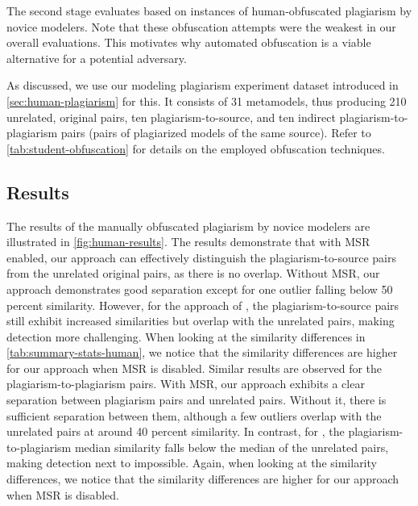 \noindent
The second stage evaluates based on instances of human-obfuscated plagiarism by novice modelers.
Note that these obfuscation attempts were the weakest in our overall evaluations. This motivates why automated obfuscation is a viable alternative for a potential adversary.

As discussed, we use our modeling plagiarism experiment dataset introduced in \autoref{sec:human-plagiarism} for this.
It consists of 31 metamodels, thus producing 210 unrelated, original pairs, ten plagiarism-to-source, and ten indirect plagiarism-to-plagiarism pairs (pairs of plagiarized models of the same source). Refer to \autoref{tab:student-obfuscation} for details on the employed obfuscation techniques.

\subsection{Results}
The results of the manually obfuscated plagiarism by novice modelers are illustrated in \autoref{fig:human-results}.
The results demonstrate that with MSR enabled, our approach can effectively distinguish the plagiarism-to-source pairs from the unrelated original pairs, as there is no overlap. Without MSR, our approach demonstrates good separation except for one outlier falling below 50 percent similarity. However, for the approach of \citet{Martinez2020}, the plagiarism-to-source pairs still exhibit increased similarities but overlap with the unrelated pairs, making detection more challenging.
When looking at the similarity differences in \autoref{tab:summary-stats-human}, we notice that the similarity differences are higher for our approach when MSR is disabled.
%
Similar results are observed for the plagiarism-to-plagiarism pairs. With MSR, our approach exhibits a clear separation between plagiarism pairs and unrelated pairs. Without it, there is sufficient separation between them, although a few outliers overlap with the unrelated pairs at around 40 percent similarity. In contrast, for \citet{Martinez2020}, the plagiarism-to-plagiarism median similarity falls below the median of the unrelated pairs, making detection next to impossible.
Again, when looking at the similarity differences, we notice that the similarity differences are higher for our approach when MSR is disabled.

